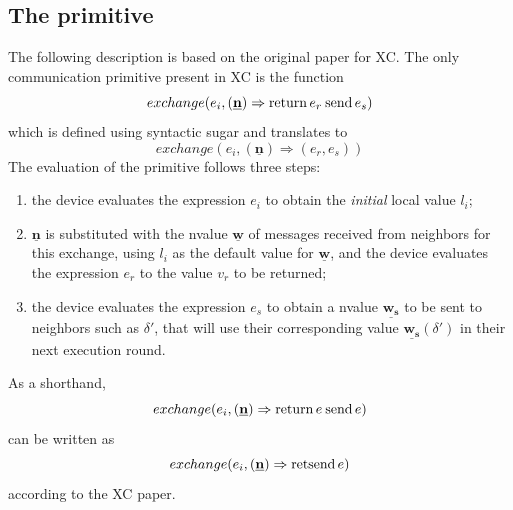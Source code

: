 \subsection{The  primitive}

The following description is based on the original paper for \ac{XC}\cite{xc}.
%
The only communication primitive present in \ac{XC} is the function $$exchange(e_i, (\underline{\mathbf{n}}) \Rightarrow \mathbf{\operatorname{return\,}} e_r \mathbf{\operatorname{\:send\,}} e_s)$$ which is defined using syntactic sugar and translates to $$exchange(e_i, (\underline{\mathbf{n}}) \Rightarrow (e_r, e_s))$$
%
The evaluation of the primitive follows three steps:
\begin{enumerate}
    \item the device evaluates the expression $e_i$ to obtain the \textit{initial} local value $l_i$;
    \item $\underline{\mathbf{n}}$ is substituted with the nvalue $\underline{\mathbf{w}}$ of messages received from neighbors for this exchange, using $l_i$ as the default value for $\underline{\mathbf{w}}$, and the device evaluates the expression $e_r$ to the value $v_r$ to be returned;
    \item the device evaluates the expression $e_s$ to obtain a nvalue $\underline{\mathbf{w_s}}$ to be sent to neighbors such as $\delta'$, that will use their corresponding value $\underline{\mathbf{w_s}}(\delta')$ in their next execution round.
\end{enumerate}

As a shorthand, $$exchange(e_i, (\underline{\mathbf{n}}) \Rightarrow \mathbf{\operatorname{return\,}} e \mathbf{\operatorname{\:send\,}} e)$$ can be written as $$exchange(e_i, (\underline{\mathbf{n}}) \Rightarrow \mathbf{\operatorname{retsend\,}} e)$$ according to the \ac{XC} paper\cite{xc}.

